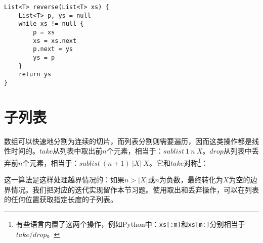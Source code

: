 \documentclass[b5paper]{ctexart}
\begin{document}
\begin{lstlisting}[language=Bourbaki]
List<T> reverse(List<T> xs) {
    List<T> p, ys = null
    while xs != null {
        p = xs
        xs = xs.next
        p.next = ys
        ys = p
    }
    return ys
}
\end{lstlisting}

\begin{Exercise}\label{ex:list-transform}
\end{Exercise}

\begin{Answer}[ref = {ex:list-transform}]
\end{Answer}

\section{子列表}
   

数组可以快速地分割为连续的切片，而列表分割则需要遍历，因而这类操作都是线性时间的。$take$从列表中取出前$n$个元素，相当于：$sublist\ 1\ n\ X$。$drop$从列表中丢弃前$n$个元素，相当于：$sublist\ (n+1)\ |X|\ X$。它和$take$对称\footnote{有些语言内置了这两个操作，例如Python中：\texttt{xs[:m]}和\texttt{xs[m:]}分别相当于$take/drop$。}：

\be
{}
\ee

这一算法是这样处理越界情况的：如果$n > |X|$或$n$为负数，最终转化为$X$为空的边界情况。我们把对应的迭代实现留作本节习题。使用取出和丢弃操作，可以在列表的任何位置获取指定长度的子列表。
\end{document}
